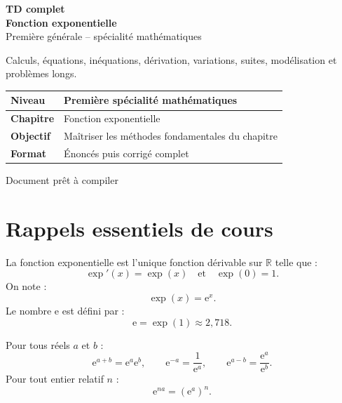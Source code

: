 \documentclass[11pt,a4paper]{article}
\newcommand{\R}{\mathbb{R}}
\newcommand{\e}{\mathrm{e}}
\begin{document}
\begin{titlepage}
\centering

\vspace*{2cm}

{\Huge \textbf{TD complet}}\\[0.3cm]
{\Huge \textbf{Fonction exponentielle}}\\[0.5cm]
{\Large Première générale -- spécialité mathématiques}\\[1cm]

\begin{tcolorbox}[colback=blue!5,colframe=bleu,width=0.85\textwidth]
\centering
\Large
Calculs, équations, inéquations, dérivation, variations, suites, modélisation et problèmes longs.
\end{tcolorbox}

\vfill

\begin{tabular}{|>{\bfseries}l|l|}
\hline
Niveau & Première spécialité mathématiques \\
\hline
Chapitre & Fonction exponentielle \\
\hline
Objectif & Maîtriser les méthodes fondamentales du chapitre \\
\hline
Format & Énoncés puis corrigé complet \\
\hline
\end{tabular}

\vfill

{\large Document prêt à compiler}

\end{titlepage}

\tableofcontents
\newpage

\section{Rappels essentiels de cours}

\begin{rappelbox}
La fonction exponentielle est l'unique fonction dérivable sur $\R$ telle que :
\[
\exp'(x)=\exp(x)
\quad \text{et} \quad
\exp(0)=1.
\]
On note :
\[
\exp(x)=\e^x.
\]
Le nombre $\e$ est défini par :
\[
\e=\exp(1)\approx 2{,}718.
\]
\end{rappelbox}

\begin{rappelbox}
Pour tous réels $a$ et $b$ :
\[
\e^{a+b}=\e^a\e^b,
\qquad
\e^{-a}=\frac{1}{\e^a},
\qquad
\e^{a-b}=\frac{\e^a}{\e^b}.
\]
Pour tout entier relatif $n$ :
\[
\e^{na}=(\e^a)^n.
\]
\end{rappelbox}
\end{document}
